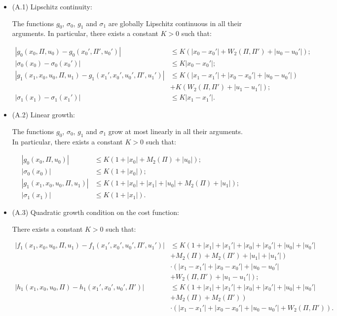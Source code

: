 \documentclass[12pt]{article}
\theoremstyle{definition}
\begin{document}
\begin{itemize}

\item (A.1) Lipschitz continuity:

The functions \( g_0 \), \( \sigma_0 \), \( g_1 \) and \( \sigma_1 \) are globally Lipschitz continuous in all their arguments. In particular, there exists a constant \( K > 0 \) such that:

\begin{align*}
|g_0(x_0, \Pi, u_0) - g_0(x_0', \Pi', u_0')| &\leq K \left( |x_0 - x_0'| + W_2(\Pi, \Pi') + |u_0 - u_0'| \right);\\
|\sigma_0(x_0) - \sigma_0(x_0')| &\leq K |x_0 - x_0'|;\\
|g_1(x_1, x_0, u_0, \Pi, u_1) - g_1(x_1', x_0', u_0', \Pi', u_1')| &\leq K \left( |x_1 - x_1'| + |x_0 - x_0'| + |u_0 - u_0'| \right) \\
& + K\left(W_2(\Pi, \Pi') + |u_1 - u_1'| \right);\\
|\sigma_1(x_1) - \sigma_1(x_1')| &\leq K |x_1 - x_1'|.
\end{align*}

\item (A.2) Linear growth:

The functions \( g_0 \), \( \sigma_0 \), \( g_1 \) and \( \sigma_1 \) grow at most linearly in all their arguments. In particular, there exists a constant \( K > 0 \) such that:

\begin{align*}
|g_0(x_0, \Pi, u_0)| &\leq K(1 + |x_0| + M_2(\Pi) + |u_0|);\\
|\sigma_0(x_0)| &\leq K(1 + |x_0|);\\
|g_1(x_1, x_0, u_0, \Pi, u_1)| &\leq K(1 + |x_0| + |x_1| + |u_0| + M_2(\Pi) + |u_1|);\\
|\sigma_1(x_1)| &\leq K(1 + |x_1|).
\end{align*}

\item (A.3) Quadratic growth condition on the cost function:

There exists a constant \( K > 0 \) such that:

\begin{align*}
|f_1(x_1, x_0, u_0, \Pi, u_1) - f_1(x_1', x_0', u_0', \Pi', u_1')| &\leq K \left( 1 + |x_1| + |x_1'| + |x_0| + |x_0'| + |u_0| + |u_0'| \right. \\
&+ \left. M_2(\Pi) + M_2(\Pi') + |u_1| + |u_1'| \right) \\
&\cdot \left( |x_1 - x_1'| + |x_0 - x_0'| + |u_0 - u_0'|\right. \\
&+\left. W_2(\Pi, \Pi') + |u_1 - u_1'| \right);\\
|h_1(x_1, x_0, u_0, \Pi) - h_1(x_1', x_0', u_0', \Pi')| &\leq K \left( 1 + |x_1| + |x_1'| + |x_0| + |x_0'| + |u_0| + |u_0'| \right. \\
&+\left. M_2(\Pi) + M_2(\Pi') \right)\\
&\cdot \left( |x_1 - x_1'| + |x_0 - x_0'| + |u_0 - u_0'| + W_2(\Pi, \Pi') \right).
\end{align*}


\end{itemize}
\end{document}
